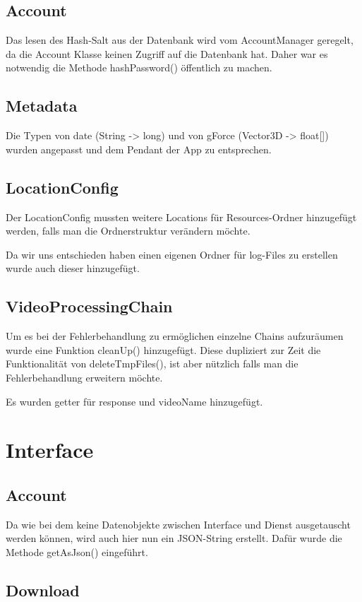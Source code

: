 \subsection{Account}
Das lesen des Hash-Salt aus der Datenbank wird vom AccountManager geregelt, da die Account Klasse keinen Zugriff auf die Datenbank hat. Daher war es notwendig die Methode hashPassword() öffentlich zu machen.

\subsection{Metadata}
Die Typen von date (String -> long) und von gForce (Vector3D -> float[]) wurden angepasst und dem Pendant der App zu entsprechen.

\subsection{LocationConfig}
Der LocationConfig mussten weitere Locations für Resources-Ordner hinzugefügt werden, falls man die Ordnerstruktur verändern möchte. \par
Da wir uns entschieden haben einen eigenen Ordner für log-Files zu erstellen wurde auch dieser hinzugefügt.

\subsection{VideoProcessingChain}
Um es bei der Fehlerbehandlung zu ermöglichen einzelne Chains aufzuräumen wurde eine Funktion cleanUp() hinzugefügt. Diese dupliziert zur Zeit die Funktionalität von deleteTmpFiles(), ist aber nützlich falls man die Fehlerbehandlung erweitern möchte. \par 
Es wurden getter für response und videoName hinzugefügt.

\section{Interface}

\subsection{Account}
Da wie bei dem  keine Datenobjekte zwischen Interface und Dienst ausgetauscht werden können, wird auch hier nun ein JSON-String erstellt. Dafür wurde die Methode getAsJson() eingeführt.

\subsection{Download} \label{sec:Download}